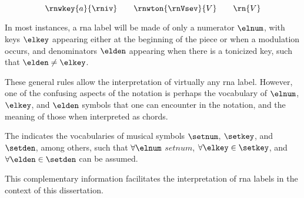 \begin{equation}
    \label{eq:rn_three_annotations}
    \rnwkey{a}{\rniv} \qquad \rnwton{\rnVsev}{V} \qquad \rn{V}
\end{equation}


In most instances, a \gls{rna} label will be made of only a
numerator $\elnum$, with keys $\elkey$ appearing either at
the beginning of the piece or when a modulation occurs, and
denominators $\elden$ appearing when there is a tonicized
key, such that $\elden \neq \elkey$.

These general rules allow the interpretation of virtually
any \gls{rna} label. However, one of the confusing aspects
of the notation is perhaps the vocabulary of $\elnum$,
$\elkey$, and $\elden$ symbols that one can encounter in the
notation, and the meaning of those when interpreted as
chords.

The 
indicates the vocabularies of musical symbols $\setnum$,
$\setkey$, and $\setden$, among others, such that $\forall
\elnum$ \in $setnum$, $\forall \elkey \in \setkey$, and
$\forall \elden \in \setden$ can be assumed.

This complementary information facilitates the
interpretation of \gls{rna} labels in the context of this
dissertation.
